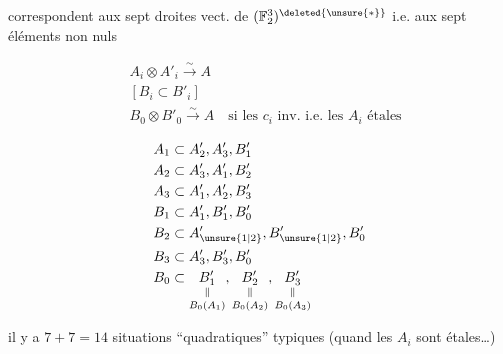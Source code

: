 correspondent aux sept droites vect. de $(\mathbb F_2^3)^{\deleted{\unsure{\ast}}}$ i.e. aux  sept éléments non nuls

\[
\begin{aligned}
&A_i\otimes A'_i\xrightarrow{\sim} A\\
&[B_i\subset B'_i]\\
&B_0\otimes B'_0\xrightarrow{\sim} A\quad\text{si les $c_i$ inv. i.e. les $A_i$ étales}
\end{aligned}
\]

\[
\begin{aligned}
A_1&\subset A'_2,A'_3,B'_1\\
A_2&\subset A'_3,A'_1,B'_2\\
A_3&\subset A'_1,A'_2,B'_3\\
B_1&\subset A'_1,B'_1,B'_0\\
B_2&\subset A'_{\unsure{1|2}},B'_{\unsure{1|2}},B'_0\\
B_3&\subset A'_3,B'_3,B'_0\\
B_0&\subset \underset{B_0(A_1)}{\underset{\Vert}{B'_1}},\underset{B_0(A_2)}{\underset{\Vert}{B'_2}},\underset{B_0(A_3)}{\underset{\Vert}{B'_3}}
\end{aligned}
\]

il y a $7+7=14$ situations ``quadratiques'' typiques (quand les $A_i$ sont étales\ldots)
